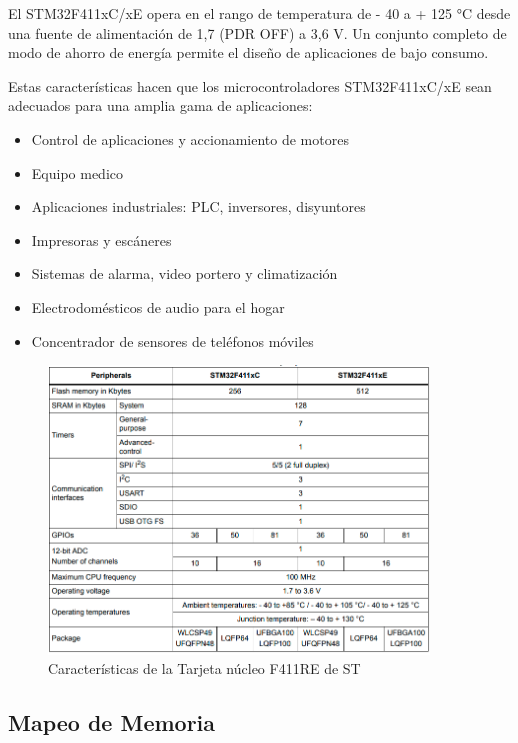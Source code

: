 El STM32F411xC/xE opera en el rango de temperatura de - 40 a + 125 °C desde una fuente de alimentación de 1,7 (PDR OFF) a 3,6 V. Un conjunto completo de modo de ahorro de energía permite el diseño de aplicaciones de bajo consumo.

Estas características hacen que los microcontroladores STM32F411xC/xE sean adecuados para una amplia gama de aplicaciones:

\begin{itemize}
	\item Control de aplicaciones y accionamiento de motores
	\item Equipo medico
	\item Aplicaciones industriales: PLC, inversores, disyuntores
	\item Impresoras y escáneres
	\item Sistemas de alarma, video portero y climatización
	\item Electrodomésticos de audio para el hogar
	\item Concentrador de sensores de teléfonos móviles
\end{itemize}


\begin{figure}[htb]
	\centering
	\includegraphics[width=0.9\textwidth]{capitulo1/caracteristicas.png}
	\caption{Características de la Tarjeta núcleo F411RE de ST}
	\label{cap1:002}
\end{figure} 

\subsection{Mapeo de Memoria}

